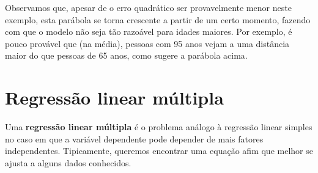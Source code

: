 \documentclass[../livro.tex]{subfiles}  %
\begin{document}
\begin{example}
  \noindent Observamos que, apesar de o erro quadrático ser provavelmente menor neste exemplo, esta parábola se torna crescente a partir de um certo momento, fazendo com que o modelo não seja tão razoável para idades maiores. Por exemplo, é pouco provável que (na média), pessoas com 95 anos vejam a uma distância maior do que pessoas de 65 anos, como sugere a parábola acima.
\end{example}



\section{Regressão linear múltipla}

Uma \textbf{regressão linear múltipla} é o problema análogo à regressão linear simples no caso em que a variável dependente pode depender de mais fatores independentes. Tipicamente, queremos encontrar uma equação afim que melhor se ajusta a alguns dados conhecidos.
\end{document}
